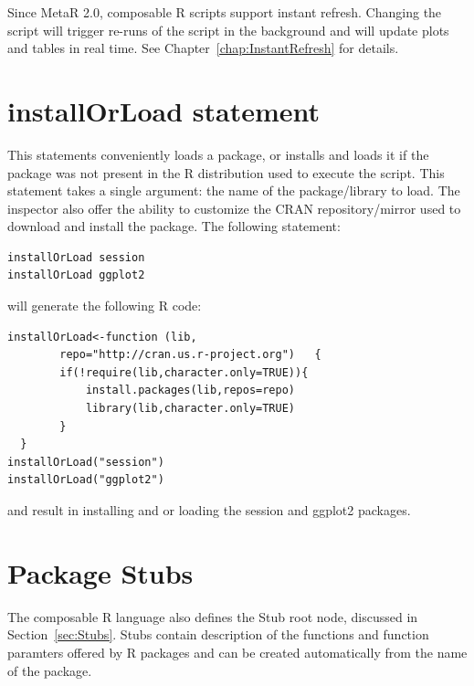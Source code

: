 Since MetaR 2.0, composable R scripts support instant refresh. Changing the script will trigger re-runs of the script in the background and will update plots and tables in real time. See Chapter~\ref{chap:InstantRefresh} for details. 

\section{installOrLoad statement}\label{sec:installOrLoad}
This statements conveniently loads a package, or installs and loads it if the package was not present in the R distribution used to execute the script. This statement takes a single argument: the name of the package/library to load. The inspector also offer the ability to customize the CRAN repository/mirror used to download and install  the package. 
The following statement:
\begin{lstlisting}
installOrLoad session
installOrLoad ggplot2
\end{lstlisting}
will generate the following R code:

\begin{lstlisting}
installOrLoad<-function (lib,
		repo="http://cran.us.r-project.org")   {
		if(!require(lib,character.only=TRUE)){
			install.packages(lib,repos=repo)
  			library(lib,character.only=TRUE)
  		}
  }
installOrLoad("session")
installOrLoad("ggplot2")
\end{lstlisting}
and result in installing and or loading the session and ggplot2 packages.

\section{Package Stubs}
The composable R language also defines the Stub root node, discussed in Section~\ref{sec:Stubs}. Stubs contain description of the functions and function paramters offered by R packages and can be created automatically from the name of the package.




